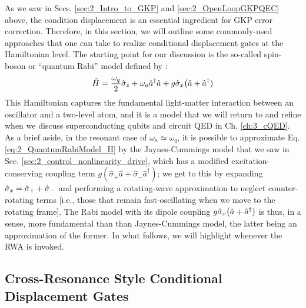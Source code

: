 As we saw in Secs. \ref{sec:2_Intro_to_GKP} and \ref{sec:2_OpenLoopGKPQEC} above, the condition displacement is an essential ingredient for GKP error correction. Therefore, in this section, we will  outline some commonly-used approaches that one can take to realize conditional displacement gates at the Hamiltonian level. The starting point for our discussion is the so-called spin-boson or ``quantum Rabi'' model defined by \cite{hagelstein2004introductory}:
\begin{equation}
\hat{H} = \frac{\omega_q}{2}\hat{\sigma}_z + \omega_a \hat{a}^\dagger \hat{a} + g\hat{\sigma}_x\big(\hat{a} + \hat{a}^\dagger)
\label{eq:2_QuantumRabiModel_H}
\end{equation}
This Hamiltonian captures the fundamental light-matter interaction between an oscillator and a two-level atom, and it is a model that we will return to and refine when we discuss superconducting qubits and circuit QED in Ch. \ref{ch:3_cQED}. As a brief aside, in the resonant case of $\omega_a \simeq \omega_q$, it is possible to approximate Eq. \eqref{eq:2_QuantumRabiModel_H} by the Jaynes-Cummings model that we saw in Sec. \ref{sec:2_control_nonlinearity_drive}, which has a modified excitation-conserving coupling term $g(\hat{\sigma}_+\hat{a} + \hat{\sigma}_-\hat{a}^\dagger)$; we get to this by expanding $\hat{\sigma}_x = \hat{\sigma}_+ + \hat{\sigma}_-$ and performing a rotating-wave approximation to neglect counter-rotating terms [i.e., those that remain fast-oscillating when we move to the rotating frame]. The Rabi model with its dipole coupling $g\hat{\sigma}_x\big(\hat{a} + \hat{a}^\dagger)$ is thus, in a sense, more fundamental than than Jaynes-Cummings model, the latter being an approximation of the former. In what follows, we will highlight whenever the RWA is invoked.

\subsection{Cross-Resonance Style Conditional Displacement Gates}

